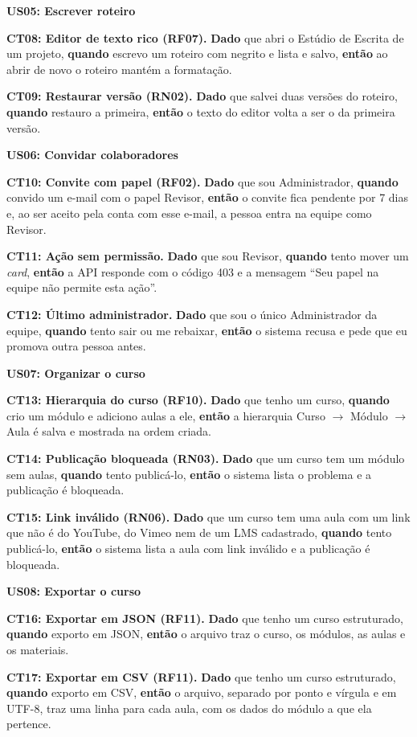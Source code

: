 \begin{small}
\textbf{US05: Escrever roteiro}

\textbf{CT08: Editor de texto rico (RF07).} \textbf{Dado} que abri o Estúdio de Escrita de um projeto, \textbf{quando} escrevo um roteiro com negrito e lista e salvo, \textbf{então} ao abrir de novo o roteiro mantém a formatação.

\textbf{CT09: Restaurar versão (RN02).} \textbf{Dado} que salvei duas versões do roteiro, \textbf{quando} restauro a primeira, \textbf{então} o texto do editor volta a ser o da primeira versão.

\textbf{US06: Convidar colaboradores}

\textbf{CT10: Convite com papel (RF02).} \textbf{Dado} que sou Administrador, \textbf{quando} convido um e-mail com o papel Revisor, \textbf{então} o convite fica pendente por 7 dias e, ao ser aceito pela conta com esse e-mail, a pessoa entra na equipe como Revisor.

\textbf{CT11: Ação sem permissão.} \textbf{Dado} que sou Revisor, \textbf{quando} tento mover um \textit{card}, \textbf{então} a API responde com o código 403 e a mensagem ``Seu papel na equipe não permite esta ação''.

\textbf{CT12: Último administrador.} \textbf{Dado} que sou o único Administrador da equipe, \textbf{quando} tento sair ou me rebaixar, \textbf{então} o sistema recusa e pede que eu promova outra pessoa antes.

\textbf{US07: Organizar o curso}

\textbf{CT13: Hierarquia do curso (RF10).} \textbf{Dado} que tenho um curso, \textbf{quando} crio um módulo e adiciono aulas a ele, \textbf{então} a hierarquia Curso $\rightarrow$ Módulo $\rightarrow$ Aula é salva e mostrada na ordem criada.

\textbf{CT14: Publicação bloqueada (RN03).} \textbf{Dado} que um curso tem um módulo sem aulas, \textbf{quando} tento publicá-lo, \textbf{então} o sistema lista o problema e a publicação é bloqueada.

\textbf{CT15: Link inválido (RN06).} \textbf{Dado} que um curso tem uma aula com um link que não é do YouTube, do Vimeo nem de um LMS cadastrado, \textbf{quando} tento publicá-lo, \textbf{então} o sistema lista a aula com link inválido e a publicação é bloqueada.

\textbf{US08: Exportar o curso}

\textbf{CT16: Exportar em JSON (RF11).} \textbf{Dado} que tenho um curso estruturado, \textbf{quando} exporto em JSON, \textbf{então} o arquivo traz o curso, os módulos, as aulas e os materiais.

\textbf{CT17: Exportar em CSV (RF11).} \textbf{Dado} que tenho um curso estruturado, \textbf{quando} exporto em CSV, \textbf{então} o arquivo, separado por ponto e vírgula e em UTF-8, traz uma linha para cada aula, com os dados do módulo a que ela pertence.

\end{small}

